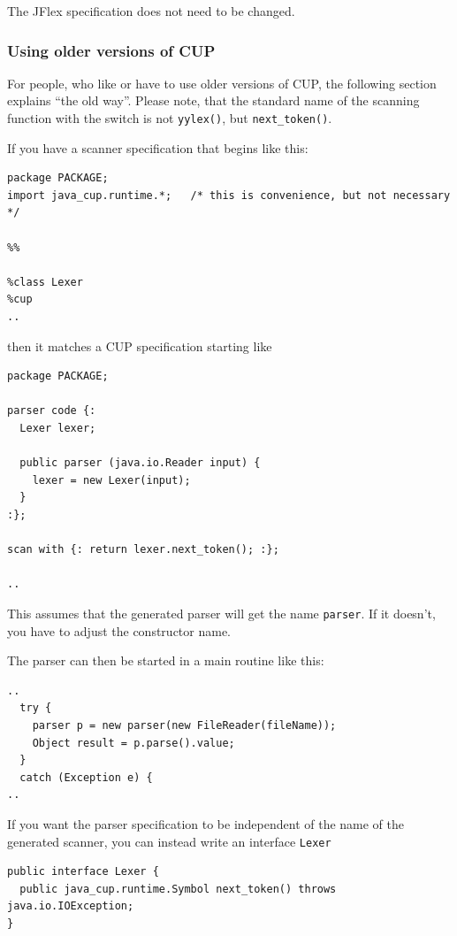 \documentclass[11pt]{scrartcl}
\newcommand{\xsmall}{}
\begin{document}
The JFlex specification does not need to be changed.

\subsubsection{Using older versions of CUP}
For people, who like or have to use older versions of CUP, the following section 
explains ``the old way''. Please note, that the standard name of the scanning 
function with the \texttt{} switch is not 
\texttt{yylex()}, but \texttt{next\_token()}.

If you have a scanner specification that begins like this:

{\xsmall\begin{verbatim}
package PACKAGE;
import java_cup.runtime.*;   /* this is convenience, but not necessary */
 
%%
 
%class Lexer
%cup
..
\end{verbatim}
}

then it matches a CUP specification starting  like

{\xsmall\begin{verbatim}
package PACKAGE;

parser code {:
  Lexer lexer;

  public parser (java.io.Reader input) {
    lexer = new Lexer(input);
  }
:};

scan with {: return lexer.next_token(); :};

..
\end{verbatim}
}

This assumes that the generated parser will get the name \texttt{parser}.
If it doesn't, you have to adjust the constructor name.

The parser can then be started in a main routine like this:

{\xsmall\begin{verbatim}
..
  try {
    parser p = new parser(new FileReader(fileName));
    Object result = p.parse().value; 
  }
  catch (Exception e) {
..
\end{verbatim} 
}

If you want the parser specification to be independent of the name of the generated
scanner, you can instead write an interface \texttt{Lexer}

{\xsmall\begin{verbatim}
public interface Lexer {
  public java_cup.runtime.Symbol next_token() throws java.io.IOException;
}
\end{verbatim}
}
\end{document}
